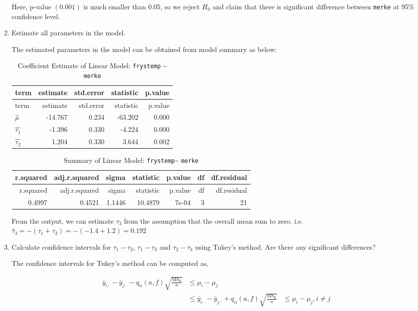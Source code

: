 \documentclass[11pt,a4paper]{article}
\begin{document}
\begin{enumerate}
  Here, p-value \(\left(0.001\right)\) is much smaller than 0.05, so we
  reject \(H_0\) and claim that there is significant difference between
  \texttt{merke} at 95\% confidence level.
\item
  Estimate all parameters in the model.

  The estimated parameters in the model can be obtained from model
  summary as below:

  \begin{longtable}[c]{@{}lrrrr@{}}
  \caption{Coefficient Estimate of Linear Model: \texttt{frystemp}
  \textasciitilde{} \texttt{merke}}\tabularnewline
  \toprule
  term & estimate & std.error & statistic & p.value\tabularnewline
  \midrule
  \endfirsthead
  \toprule
  term & estimate & std.error & statistic & p.value\tabularnewline
  \midrule
  \endhead
  \(\hat{\mu}\) & -14.767 & 0.234 & -63.202 & 0.000\tabularnewline
  \(\hat{\tau_1}\) & -1.396 & 0.330 & -4.224 & 0.000\tabularnewline
  \(\hat{\tau_2}\) & 1.204 & 0.330 & 3.644 & 0.002\tabularnewline
  \bottomrule
  \end{longtable}

  \begin{longtable}[c]{@{}rrrrrrr@{}}
  \caption{Summary of Linear Model: \texttt{frystemp}\textasciitilde{}
  \texttt{merke}}\tabularnewline
  \toprule
  r.squared & adj.r.squared & sigma & statistic & p.value & df &
  df.residual\tabularnewline
  \midrule
  \endfirsthead
  \toprule
  r.squared & adj.r.squared & sigma & statistic & p.value & df &
  df.residual\tabularnewline
  \midrule
  \endhead
  0.4997 & 0.4521 & 1.1446 & 10.4879 & 7e-04 & 3 & 21\tabularnewline
  \bottomrule
  \end{longtable}

  From the output, we can estimate \(\tau_3\) from the assumption that
  the overall mean sum to zero. i.e.
  \(\hat{\tau}_3 = -\left(\tau_1 + \tau_2\right) = -(-1.4+1.2) = 0.192\)
\item
  Calculate confidence intervals for \(\tau_1 - \tau_2\),
  \(\tau_1 - \tau_3\) and \(\tau_2 - \tau_3\) using Tukey's method. Are
  there any significant differences?

  The confidence intervals for Tukey's method can be computed as,

  \[
  \begin{aligned}
  \bar{y}_{i\cdot} - \bar{y}_{j\cdot} - q_\alpha (a, f)\sqrt{\frac{\text{MS}_\text{E}}{n}} &\le \mu_i - \mu_j\\
  & \le \bar{y}_{i\cdot} - \bar{y}_{j\cdot} + q_\alpha (a, f)\sqrt{\frac{\text{MS}_\text{E}}{n}} &\le \mu_i - \mu_j, i \ne j
  \end{aligned}
  \]


\end{enumerate}
\end{document}
